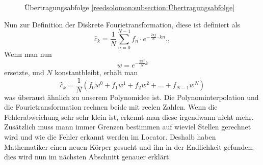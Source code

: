 \begin{figure}
	\centering
	\caption{Übertragungsabfolge \ref{reedsolomon:subsection:Übertragungsabfolge}}
	\label{fig:sendorder}
\end{figure}

Nun zur Definition der Diskrete Fourietransformation, diese ist definiert als
 \begin{equation}
	\hat{c}_{k} 
	= \frac{1}{N} \sum_{n=0}^{N-1}
	{f}_n \cdot e^{-\frac{2\pi j}{N} \cdot kn}.
	,\label{reedsolomon:DFT}
 \end{equation}
 Wenn man nun 
 \begin{equation}
	w =
	e^{-\frac{2\pi j}{N} k}
	\label{reedsolomon:DFT_summand}
 \end{equation}
 ersetzte, und $N$ konstantbleibt, erhält man
 \begin{equation}
	\hat{c}_{k}=
	\frac{1}{N}( {f}_0 w^0 + {f}_1 w^1 + {f}_2 w^2 + \dots + {f}_{N-1} w^N)
	\label{reedsolomon:DFT_polynom}
 \end{equation}
 was überaust ähnlich zu unserem Polynomidee ist.
Die Polynominterpolation und die Fourietransformation rechnen beide mit reelen Zahlen.
Wenn die Fehlerabweichung sehr sehr klein ist, erkennt man diese irgendwann nicht mehr.
Zusätzlich muss mann immer Grenzen bestimmen auf wieviel Stellen gerechnet wird und wie die Fehler erkannt werden im Locator.
Deshalb haben Mathematiker einen neuen Körper gesucht und ihn in der Endlichkeit gefunden,
dies wird nun im nächsten Abschnitt genauer erklärt.

